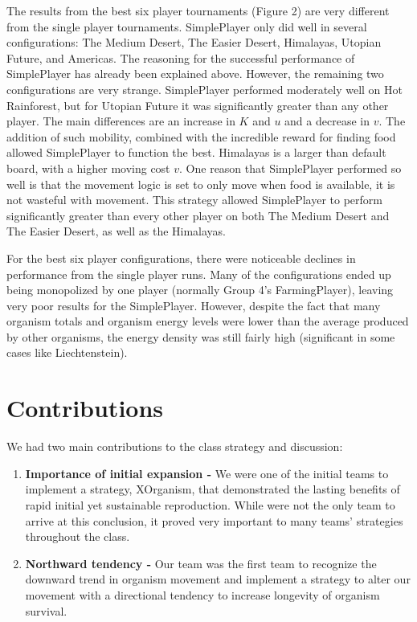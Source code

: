 \documentclass[
10pt, %
letterpaper, %
oneside, %
headinclude,footinclude, %
english
]{article}
\begin{document}
The results from the best six player tournaments (Figure 2) are very different from the single player tournaments. SimplePlayer only did well in several configurations: The Medium Desert, The Easier Desert, Himalayas, Utopian Future, and Americas. The reasoning for the successful performance of SimplePlayer has already been explained above. However, the remaining two configurations are very strange. SimplePlayer performed moderately well on Hot Rainforest, but for Utopian Future it was significantly greater than any other player. The main differences are an increase in $K$ and $u$ and a decrease in $v$. The addition of such mobility, combined with the incredible reward for finding food allowed SimplePlayer to function the best. Himalayas is a larger than default board, with a higher moving cost $v$. One reason that SimplePlayer performed so well is that the movement logic is set to only move when food is available, it is not wasteful with movement. This strategy allowed SimplePlayer to perform significantly greater than every other player on both The Medium Desert and The Easier Desert, as well as the Himalayas.

For the best six player configurations, there were noticeable declines in performance from the single player runs. Many of the configurations ended up being monopolized by one player (normally Group 4's FarmingPlayer), leaving very poor results for the SimplePlayer. However, despite the fact that many organism totals and organism energy levels were lower than the average produced by other organisms, the energy density was still fairly high (significant in some cases like Liechtenstein).



\section{Contributions}

We had two main contributions to the class strategy and discussion:
\begin{enumerate}
  \item \textbf{Importance of initial expansion -} We were one of the initial teams to implement a strategy, XOrganism, that demonstrated the lasting benefits of rapid initial yet sustainable reproduction. While were not the only team to arrive at this conclusion, it proved very important to many teams' strategies throughout the class.
  \item \textbf{Northward tendency -} Our team was the first team to recognize the downward trend in organism movement and implement a strategy to alter our movement with a directional tendency to increase longevity of organism survival.
\end{enumerate}
\end{document}
